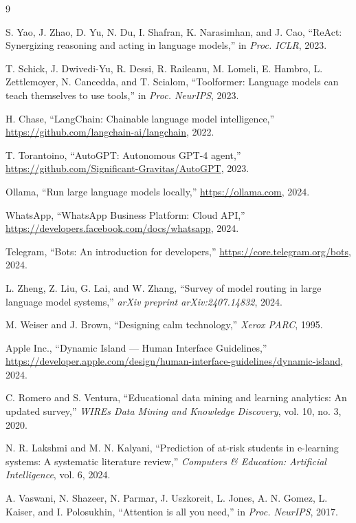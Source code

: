 \begin{thebibliography}{9}

 S. Yao, J. Zhao, D. Yu, N. Du, I. Shafran,
K. Narasimhan, and J. Cao, ``ReAct: Synergizing reasoning and
acting in language models,'' in \emph{Proc. ICLR}, 2023.

 T. Schick, J. Dwivedi-Yu, R. Dessi, R. Raileanu,
M. Lomeli, E. Hambro, L. Zettlemoyer, N. Cancedda, and
T. Scialom, ``Toolformer: Language models can teach themselves to
use tools,'' in \emph{Proc. NeurIPS}, 2023.

 H. Chase, ``LangChain: Chainable language
model intelligence,'' \url{https://github.com/langchain-ai/langchain}, 2022.

 T. Torantoino, ``AutoGPT: Autonomous GPT-4
agent,'' \url{https://github.com/Significant-Gravitas/AutoGPT}, 2023.

 Ollama, ``Run large language models locally,''
\url{https://ollama.com}, 2024.

 WhatsApp, ``WhatsApp Business Platform:
Cloud API,'' \url{https://developers.facebook.com/docs/whatsapp}, 2024.

 Telegram, ``Bots: An introduction for
developers,'' \url{https://core.telegram.org/bots}, 2024.

 L. Zheng, Z. Liu, G. Lai, and W. Zhang,
``Survey of model routing in large language model systems,''
\emph{arXiv preprint arXiv:2407.14832}, 2024.

 M. Weiser and J. Brown, ``Designing calm
technology,'' \emph{Xerox PARC}, 1995.

 Apple Inc., ``Dynamic Island --- Human Interface
Guidelines,'' \url{https://developer.apple.com/design/human-interface-guidelines/dynamic-island}, 2024.

 C. Romero and S. Ventura, ``Educational data
mining and learning analytics: An updated survey,'' \emph{WIREs
Data Mining and Knowledge Discovery}, vol. 10, no. 3, 2020.

 N. R. Lakshmi and M. N. Kalyani, ``Prediction
of at-risk students in e-learning systems: A systematic
literature review,'' \emph{Computers \& Education: Artificial
Intelligence}, vol. 6, 2024.

 A. Vaswani, N. Shazeer, N. Parmar,
J. Uszkoreit, L. Jones, A. N. Gomez, L. Kaiser, and
I. Polosukhin, ``Attention is all you need,'' in \emph{Proc.
NeurIPS}, 2017.


\end{thebibliography}
